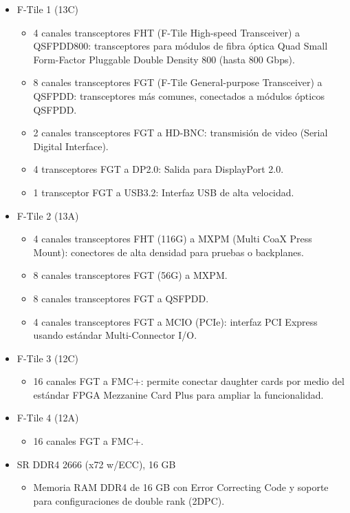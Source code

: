 \begin{itemize}
    \item F-Tile 1 (13C)
    \begin{itemize}
        \item 4 canales transceptores FHT (F-Tile High-speed Transceiver) a QSFPDD800: transceptores para m\'odulos de fibra \'optica Quad Small Form-Factor Pluggable Double Density 800 (hasta 800 Gbps).
        \item 8 canales transceptores FGT (F-Tile General-purpose Transceiver) a QSFPDD: transceptores m\'as comunes, conectados a m\'odulos \'opticos QSFPDD.
        \item 2 canales transceptores FGT a HD-BNC: transmisi\'on de video (Serial Digital Interface).
        \item 4 transceptores FGT a DP2.0: Salida para DisplayPort 2.0.
        \item 1 transceptor FGT a USB3.2: Interfaz USB de alta velocidad.
    \end{itemize}
    \item F-Tile 2 (13A)
    \begin{itemize}
        \item 4 canales transceptores FHT (116G) a MXPM (Multi CoaX Press Mount): conectores de alta densidad para pruebas o backplanes.
        \item 8 canales transceptores FGT (56G) a MXPM.
        \item 8 canales transceptores FGT a QSFPDD.
        \item 4 canales transceptores FGT a MCIO (PCIe): interfaz PCI Express usando est\'andar Multi-Connector I/O.
    \end{itemize}
    \item F-Tile 3 (12C)
    \begin{itemize}
        \item 16 canales FGT a FMC+: permite conectar daughter cards por medio del est\'andar FPGA Mezzanine Card Plus para ampliar la funcionalidad.
    \end{itemize}
    \item F-Tile 4 (12A) 
    \begin{itemize}
        \item 16 canales FGT a FMC+.
    \end{itemize}
    \item SR DDR4 2666 (x72 w/ECC), 16 GB
    \begin{itemize}
        \item Memoria RAM DDR4 de 16 GB con Error Correcting Code y soporte para configuraciones de double rank (2DPC).

\end{itemize}
\end{itemize}
